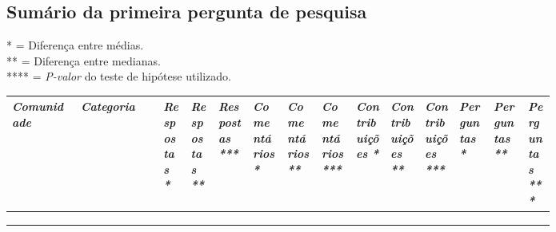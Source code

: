 
\begin{landscape}
\chapter{Sumário da primeira pergunta de pesquisa}
\label{app:q1}

\small
* = Diferença entre médias. \\
** = Diferença entre medianas. \\
**** = \textit{P-valor} do teste de hipótese utilizado. 

\begin{longtabu}{@{}
	p{0.1\linewidth}
	p{0.12\linewidth}
	P{0.04\linewidth}
	P{0.04\linewidth}
	P{0.05\linewidth}
	P{0.05\linewidth}
	P{0.05\linewidth}
	P{0.05\linewidth}
	P{0.05\linewidth}
	P{0.05\linewidth}
	P{0.05\linewidth}
	P{0.05\linewidth}
	P{0.05\linewidth}
	p{0.04\linewidth}@{}}
\toprule
\textit{Comunidade}  & \textit{Categoria}  
& \hspace{0pt}\textit{Respostas *} & \hspace{0pt}\textit{Respostas **} & \hspace{0pt}\textit{Respostas ***}
& \hspace{0pt}\textit{Comentários *} & \hspace{0pt}\textit{Comentários **} & \hspace{0pt}\textit{Comentários ***} 
& \hspace{0pt}\textit{Contribuições *}  & \hspace{0pt}\textit{Contribuições **} & \hspace{0pt}\textit{Contribuições ***}
& \hspace{0pt}\textit{Perguntas *} & \hspace{0pt}\textit{Perguntas **} & \hspace{0pt}\textit{Perguntas ***} \\ \midrule
\endhead

\\ \hline
\endfoot

\\
\endlastfoot


\end{longtabu}
\end{landscape}
